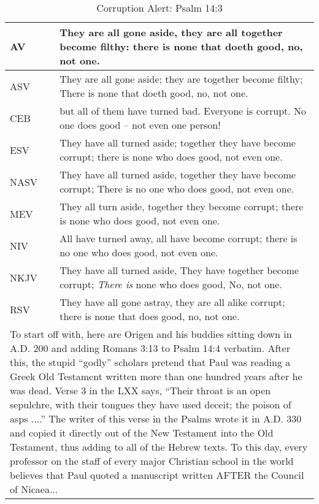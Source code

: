 
\begin{center}

\begin{table}[ht]
\centering
\begin{tabular}{|p{.5in}|p{3.5in}|}
\hline

\textcolor[rgb]{0.00,0.00,1.00}{AV} & \textcolor[rgb]{0.00,0.00,1.00}{They are all gone aside, they are all together become filthy: there is none that doeth good, no, not one.} \\ \hline
ASV & They are all gone aside; they are together become filthy;
There is none that doeth good, no, not one.\\ \hline
%
CEB &  but all of them have turned bad. Everyone is corrupt. No one does good -- not even one person!\\ \hline
ESV & They have all turned aside; together they have become corrupt; there is none who does good, not even one.\\ \hline
%
NASV &  They have all turned aside, together they have become corrupt; There is no one who does good, not even one.\\ \hline
%
MEV & They all turn aside, together they become corrupt; there is none who does good, not even one. \\ \hline
%
NIV & All have turned away, all have become corrupt;  there is no one who does good,  not even one. \\ \hline
%
NKJV &  They have all turned aside, They have together become corrupt; \emph{There is} none who does good, No, not one.\\ \hline
%
RSV &   They have all gone astray, they are all alike corrupt; there is none that does good,  no, not one.\\ \hline \hline

\multicolumn{2}{|p{4.3in}|}{{\textcolor{jungle}{To start off with, here are Origen and his buddies sitting down in A.D. 200 and adding Romans 3:13 to Psalm 14:4 verbatim. After this, the stupid ``godly'' scholars pretend that Paul was reading a Greek Old Testament written more than one hundred years after he was dead.  Verse 3 in the LXX says, ``Their throat is an open sepulchre, with their tongues they have used deceit; the poison of asps ....''  The writer of this verse in the Psalms wrote it in A.D. 330 and copied it directly out of the New Testament into the Old Testament, thus adding to all of the Hebrew texts. To this day, every professor on the staff of every major Christian school in the world believes that Paul quoted a manuscript written AFTER the Council of Nicaea..\cite{Ruckman1992PsalmsV1}.}}} \\ \hline

\end{tabular}
\caption[Corruption Alert: Psalm 14:3]{Corruption Alert: Psalm 14:3} \label{table:Corruption Psalm 14:3}

\end{table}

\end{center}
